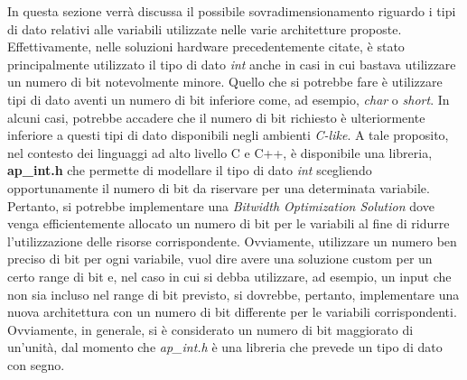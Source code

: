 In questa sezione verrà discussa il possibile sovradimensionamento riguardo i tipi di dato relativi alle variabili utilizzate nelle varie architetture proposte. Effettivamente, nelle soluzioni hardware precedentemente citate, è stato principalmente utilizzato il tipo di dato \textit{int} anche in casi in cui bastava utilizzare un numero di bit notevolmente minore. Quello che si potrebbe fare è utilizzare tipi di dato aventi un numero di bit inferiore come, ad esempio, \textit{char} o \textit{short}. In alcuni casi, potrebbe accadere che il numero di bit richiesto è ulteriormente inferiore a questi tipi di dato disponibili negli ambienti \textit{C-like}. A tale proposito, nel contesto dei linguaggi ad alto livello C e C++, è disponibile una libreria, \textbf{ap\_int.h} che permette di modellare il tipo di dato \textit{int} scegliendo opportunamente il numero di bit da riservare per una determinata variabile. Pertanto, si potrebbe implementare una \textit{Bitwidth Optimization Solution} dove venga efficientemente allocato un numero di bit per le variabili al fine di ridurre l'utilizzazione delle risorse corrispondente. Ovviamente, utilizzare un numero ben preciso di bit per ogni variabile, vuol dire avere una soluzione custom per un certo range di bit e, nel caso in cui si debba utilizzare, ad esempio, un input che non sia incluso nel range di bit previsto, si dovrebbe, pertanto, implementare una nuova architettura con un numero di bit differente per le variabili corrispondenti. Ovviamente, in generale, si è considerato un numero di bit maggiorato di un'unità, dal momento che \textit{ap\_int.h} è una libreria che prevede un tipo di dato con segno.



